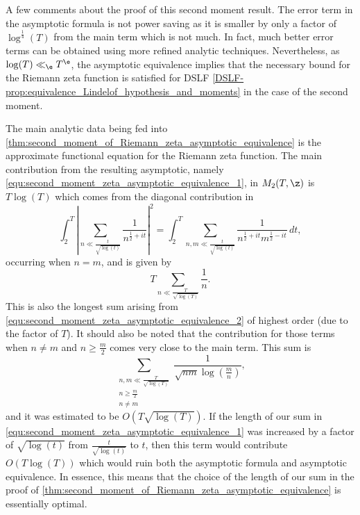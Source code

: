 \documentclass[12pt]{article}
\newcommand{\DSLFcref}[1]{DSLF \cref{#1}}
\begin{document}
      A few comments about the proof of this second moment result. The error term in the asymptotic formula is not power saving as it is smaller by only a factor of \(\log^{\frac{1}{4}}(T)\) from the main term which is not much. In fact, much better error terms can be obtained using more refined analytic techniques. Nevertheless, as \(\log(T) \ll_{\e} T^{\e}\), the asymptotic equivalence implies that the necessary bound for the Riemann zeta function is satisfied for \DSLFcref{DSLF-prop:equivalence_Lindelof_hypothesis_and_moments} in the case of the second moment.

      The main analytic data being fed into \cref{thm:second_moment_of_Riemann_zeta_asymptotic_equivalence} is the approximate functional equation for the Riemann zeta function. The main contribution from the resulting asymptotic, namely \cref{equ:second_moment_zeta_asymptotic_equivalence_1}, in \(M_{2}(T,\z)\) is \(T\log(T)\) which comes from the diagonal contribution in
      \[
        \int_{2}^{T}\left|\sum_{n \ll \frac{t}{\sqrt{\log(t)}}}\frac{1}{n^{\frac{1}{2}+it}}\right|^{2} = \int_{2}^{T}\sum_{n,m \ll \frac{t}{\sqrt{\log(t)}}}\frac{1}{n^{\frac{1}{2}+it}m^{\frac{1}{2}-it}}\,dt,
      \]
      occurring when \(n = m\), and is given by
      \[
        T\sum_{n \ll \frac{T}{\sqrt{\log(T)}}}\frac{1}{n}.
      \]
      This is also the longest sum arising from \cref{equ:second_moment_zeta_asymptotic_equivalence_2} of highest order (due to the factor of \(T\)). It should also be noted that the contribution for those terms when \(n \neq m\) and \(n \ge \frac{m}{2}\) comes very close to the main term. This sum is
      \[
        \sum_{\substack{n,m \ll \frac{T}{\sqrt{\log(T)}} \\ n \ge \frac{m}{2} \\ n \neq m}}\frac{1}{\sqrt{nm}\log\left(\frac{m}{n}\right)},
      \]
      and it was estimated to be \(O\left(T\sqrt{\log(T)}\right)\). If the length of our sum in \cref{equ:second_moment_zeta_asymptotic_equivalence_1} was increased by a factor of \(\sqrt{\log(t)}\) from \(\frac{t}{\sqrt{\log(t)}}\) to \(t\), then this term would contribute \(O\left(T\log(T)\right)\) which would ruin both the asymptotic formula and asymptotic equivalence. In essence, this means that the choice of the length of our sum in the proof of \cref{thm:second_moment_of_Riemann_zeta_asymptotic_equivalence} is essentially optimal.
\end{document}
